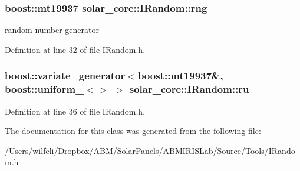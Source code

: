 \hypertarget{classsolar__core_1_1_i_random_a5d02ddbfd7b3c7a2932166b9ddba5f02}{}
\subsubsection[{rng}]{\setlength{\rightskip}{0pt plus 5cm}boost\+::mt19937 solar\+\_\+core\+::\+I\+Random\+::rng}\label{classsolar__core_1_1_i_random_a5d02ddbfd7b3c7a2932166b9ddba5f02}
random number generator 

Definition at line 32 of file I\+Random.\+h.

\hypertarget{classsolar__core_1_1_i_random_ab6a4ab724b521abecbcc87cd736edfd2}{}
\subsubsection[{ru}]{\setlength{\rightskip}{0pt plus 5cm}boost\+::variate\+\_\+generator$<$boost\+::mt19937\&, boost\+::uniform\+\_$<$$>$ $>$ solar\+\_\+core\+::\+I\+Random\+::ru}\label{classsolar__core_1_1_i_random_ab6a4ab724b521abecbcc87cd736edfd2}


Definition at line 36 of file I\+Random.\+h.



The documentation for this class was generated from the following file\+:\begin{DoxyCompactItemize}
\item 
/\+Users/wilfeli/\+Dropbox/\+A\+B\+M/\+Solar\+Panels/\+A\+B\+M\+I\+R\+I\+S\+Lab/\+Source/\+Tools/\hyperlink{_i_random_8h}{I\+Random.\+h}\end{DoxyCompactItemize}
